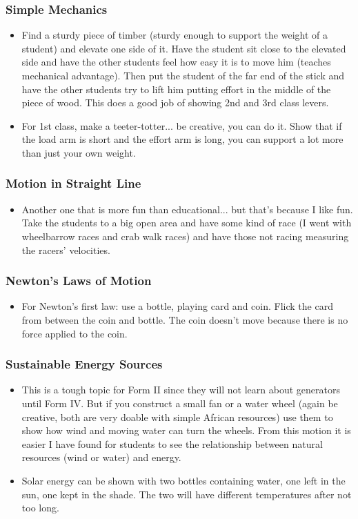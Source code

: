 \subsubsection{Simple Mechanics}
\begin{itemize}
\item	Find a sturdy piece of timber (sturdy enough to support the weight of a student) and elevate one side of it. Have the student sit close to the elevated side and have the other students feel how easy it is to move him (teaches mechanical advantage). Then put the student of the far end of the stick and have the other students try to lift him putting effort in the middle of the piece of wood. This does a good job of showing 2nd and 3rd class levers.
\item	For 1st class, make a teeter-totter... be creative, you can do it. Show that if the load arm is short and the effort arm is long, you can support a lot more than just your own weight.
\end{itemize}

\subsubsection{Motion in Straight Line}
\begin{itemize}
\item	Another one that is more fun than educational... but that's because I like fun. Take the students to a big open area and have some kind of race (I went with wheelbarrow races and crab walk races) and have those not racing measuring the racers' velocities.
\end{itemize}

\subsubsection{Newton's Laws of Motion}
\begin{itemize}
\item	For Newton's first law: use a bottle, playing card and coin.  Flick the card from between the coin and bottle.  The coin doesn't move because there is no force applied to the coin.  
\end{itemize}

\subsubsection{Sustainable Energy Sources}
\begin{itemize}
\item	This is a tough topic for Form II since they will not learn about generators until Form IV.  But if you construct a small fan or a water wheel (again be creative, both are very doable with simple African resources) use them to show how wind and moving water can turn the wheels. From this motion it is easier I have found for students to see the relationship between natural resources (wind or water) and energy. 
\item	Solar energy can be shown with two bottles containing water, one left in the sun, one kept in the shade. The two will have different temperatures after not too long.
\end{itemize}

